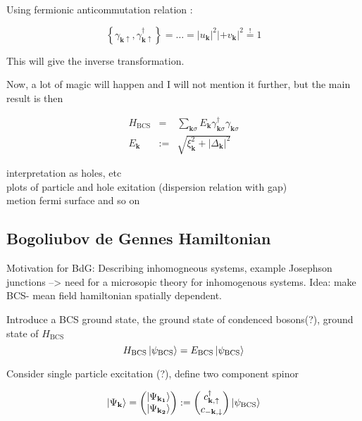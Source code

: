 Using fermionic anticommutation relation :

\begin{equation}
\left\{ \gamma_{\mathbf{k} \uparrow}, \gamma^{\dagger}_{\mathbf{k} \uparrow}  \right\}  = \dots = |u_{\mathbf{k}}|^2 | + v_{\mathbf{k}}|^2 \stackrel{!}{=} 1
\end{equation}

This will give the inverse transformation.

Now, a lot of magic will happen and I will not mention it further, but the main result is then

\begin{eqnarray}
H_{\text{BCS}} &=&  \sum_{ \mathbf{k} \sigma } E_{ \mathbf{k} } \gamma^{\dagger}_{\mathbf{k} \sigma } \gamma_{\mathbf{k} \sigma }\\
E_{\mathbf{k}} &:=&  \sqrt{\xi^2_{\mathbf{k}}  + |\Delta_{\mathbf{k}}|^2 }
\end{eqnarray}

interpretation as holes, etc \\
plots of particle and hole exitation (dispersion relation with gap)\\
metion fermi surface and so on \\
\subsection*{Bogoliubov de Gennes Hamiltonian}
Motivation for BdG: Describing inhomogneous systems, example Josephson junctions --> need for a microsopic theory for inhomogenous systems. 
Idea: make BCS- mean field hamiltonian spatially dependent. 

Introduce a BCS ground state, the ground state of condenced bosons(?), ground state of $H_\text{BCS}$
\begin{equation}
H_\text{BCS} \ket{\psi_\text{BCS}} = E_\text{BCS} \ket{\psi_\text{BCS}}  
\end{equation}

Consider single particle excitation (?), define two component spinor 

\begin{equation}
\ket{\Psi_\mathbf{k}} = \begin{pmatrix}
| \Psi_\mathbf{k_1} \rangle \\ | \Psi_\mathbf{k_2} \rangle
\end{pmatrix} := \begin{pmatrix}
c^{\dagger}_{\mathbf{k}, \uparrow} \\ c_{- \mathbf{k}, \downarrow}
\end{pmatrix} \ket{\psi_\text{BCS}}
\end{equation}

